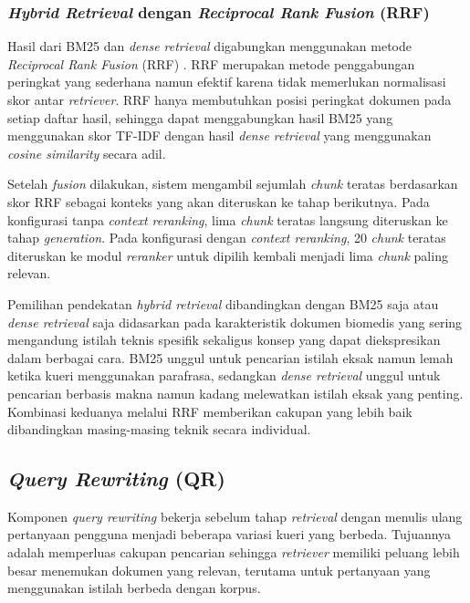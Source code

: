 \subsubsection{\textit{Hybrid Retrieval} dengan \textit{Reciprocal Rank Fusion} (RRF)}
\label{subsubsec:hybrid-retrieval}

Hasil dari BM25 dan \textit{dense retrieval} digabungkan menggunakan metode \textit{Reciprocal Rank Fusion} (RRF) \parencite{cormack2009reciprocal}. RRF merupakan metode penggabungan peringkat yang sederhana namun efektif karena tidak memerlukan normalisasi skor antar \textit{retriever}. RRF hanya membutuhkan posisi peringkat dokumen pada setiap daftar hasil, sehingga dapat menggabungkan hasil BM25 yang menggunakan skor TF-IDF dengan hasil \textit{dense retrieval} yang menggunakan \textit{cosine similarity} secara adil.

Setelah \textit{fusion} dilakukan, sistem mengambil sejumlah \textit{chunk} teratas berdasarkan skor RRF sebagai konteks yang akan diteruskan ke tahap berikutnya. Pada konfigurasi tanpa \textit{context reranking}, lima \textit{chunk} teratas langsung diteruskan ke tahap \textit{generation}. Pada konfigurasi dengan \textit{context reranking}, 20 \textit{chunk} teratas diteruskan ke modul \textit{reranker} untuk dipilih kembali menjadi lima \textit{chunk} paling relevan.

Pemilihan pendekatan \textit{hybrid retrieval} dibandingkan dengan BM25 saja atau \textit{dense retrieval} saja didasarkan pada karakteristik dokumen biomedis yang sering mengandung istilah teknis spesifik sekaligus konsep yang dapat diekspresikan dalam berbagai cara. BM25 unggul untuk pencarian istilah eksak namun lemah ketika kueri menggunakan parafrasa, sedangkan \textit{dense retrieval} unggul untuk pencarian berbasis makna namun kadang melewatkan istilah eksak yang penting. Kombinasi keduanya melalui RRF memberikan cakupan yang lebih baik dibandingkan masing-masing teknik secara individual.

\subsection{\textit{Query Rewriting} (QR)}
\label{subsec:kueri-rewriting}

Komponen \textit{query rewriting} bekerja sebelum tahap \textit{retrieval} dengan menulis ulang pertanyaan pengguna menjadi beberapa variasi kueri yang berbeda. Tujuannya adalah memperluas cakupan pencarian sehingga \textit{retriever} memiliki peluang lebih besar menemukan dokumen yang relevan, terutama untuk pertanyaan yang menggunakan istilah berbeda dengan korpus.


